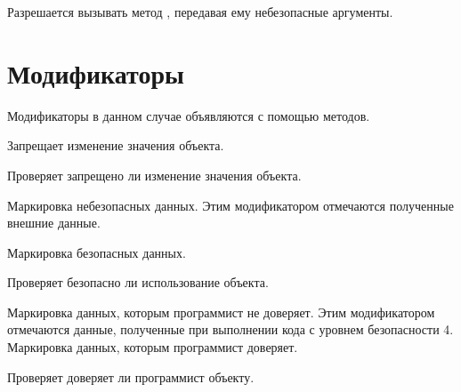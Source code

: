 Разрешается вызывать метод , передавая ему небезопасные аргументы.

\section{Модификаторы}

Модификаторы в данном случае объявляются с помощью методов.

\begin{methodlist}
  Запрещает изменение значения объекта. 
 
  Проверяет запрещено ли изменение значения объекта. 
 
  Маркировка небезопасных данных. Этим модификатором отмечаются полученные внешние данные. 
 
  Маркировка безопасных данных. 
 
  Проверяет безопасно ли использование объекта. 
 
  Маркировка данных, которым программист не доверяет. Этим модификатором отмечаются данные, полученные при выполнении кода с уровнем безопасности 4. 
  Маркировка данных, которым программист доверяет. 
 
  Проверяет доверяет ли программист объекту.
\end{methodlist} 